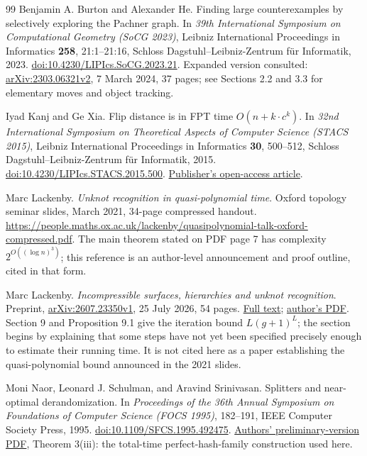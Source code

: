 \begin{thebibliography}{99}
Benjamin A. Burton and Alexander He.
Finding large counterexamples by selectively exploring the Pachner graph.
In \emph{39th International Symposium on Computational Geometry (SoCG 2023)},
Leibniz International Proceedings in Informatics \textbf{258},
21:1--21:16, Schloss Dagstuhl--Leibniz-Zentrum f\"ur Informatik, 2023.
\href{https://doi.org/10.4230/LIPIcs.SoCG.2023.21}{doi:10.4230/LIPIcs.SoCG.2023.21}.
Expanded version consulted: \href{https://arxiv.org/abs/2303.06321v2}{arXiv:2303.06321v2},
7 March 2024, 37 pages; see Sections 2.2 and 3.3 for elementary moves
and object tracking.

Iyad Kanj and Ge Xia.
Flip distance is in FPT time $O(n+k\cdot c^k)$.
In \emph{32nd International Symposium on Theoretical Aspects of Computer
Science (STACS 2015)}, Leibniz International Proceedings in Informatics
\textbf{30}, 500--512, Schloss Dagstuhl--Leibniz-Zentrum f\"ur Informatik, 2015.
\href{https://doi.org/10.4230/LIPIcs.STACS.2015.500}{doi:10.4230/LIPIcs.STACS.2015.500}.
\href{https://drops.dagstuhl.de/entities/document/10.4230/LIPIcs.STACS.2015.500}{Publisher's open-access article}.

Marc Lackenby.
\emph{Unknot recognition in quasi-polynomial time}.
Oxford topology seminar slides, March 2021, 34-page compressed handout.
\url{https://people.maths.ox.ac.uk/lackenby/quasipolynomial-talk-oxford-compressed.pdf}.
The main theorem stated on PDF page 7 has complexity
$2^{O((\log n)^3)}$; this reference is an author-level announcement and
proof outline, cited in that form.

Marc Lackenby.
\emph{Incompressible surfaces, hierarchies and unknot recognition}.
Preprint, \href{https://arxiv.org/abs/2607.23350v1}{arXiv:2607.23350v1},
25 July 2026, 54 pages.
\href{https://arxiv.org/html/2607.23350v1}{Full text};
\href{https://people.maths.ox.ac.uk/lackenby/algorithm-incompressible-250726.pdf}{author's PDF}.
Section 9 and Proposition 9.1 give the iteration bound $L(g+1)^L$;
the section begins by explaining that some steps have not yet been specified
precisely enough to estimate their running time.  It is not cited here as a
paper establishing the quasi-polynomial bound announced in the 2021 slides.

Moni Naor, Leonard J. Schulman, and Aravind Srinivasan.
Splitters and near-optimal derandomization.
In \emph{Proceedings of the 36th Annual Symposium on Foundations of Computer
Science (FOCS 1995)}, 182--191, IEEE Computer Society Press, 1995.
\href{https://doi.org/10.1109/SFCS.1995.492475}{doi:10.1109/SFCS.1995.492475}.
\href{https://www.wisdom.weizmann.ac.il/~naor/PAPERS/splitters.pdf}{Authors' preliminary-version PDF},
Theorem 3(iii): the total-time perfect-hash-family construction used here.


\end{thebibliography}
